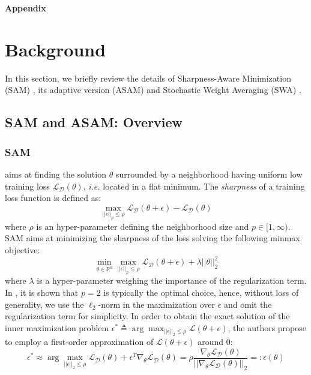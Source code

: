 {\noindent
\textbf{\Large{Appendix}}}

\section{Background}
\label{app:background}
In this section, we briefly review the details of Sharpness-Aware Minimization (SAM) \cite{foret2020sharpness}, its adaptive version (ASAM) \cite{kwon2021asam} and Stochastic Weight Averaging (SWA) \cite{izmailov2018averaging}.
\subsection{SAM and ASAM: Overview}
\subsubsection{SAM} aims at finding the solution $\theta$ surrounded by a neighborhood having uniform low training loss $\mathcal{L}_\mathcal{D}(\theta)$, \textit{i.e.} located in a flat minimum. The \textit{sharpness} of a training loss function is defined as:
\begin{equation}
    \max_{||\epsilon||_p \leq \rho}  \mathcal{L}_\mathcal{D}(\theta+\epsilon) - \mathcal{L}_\mathcal{D}(\theta)
    \label{math:sharpness}
\end{equation}
where $\rho$ is an hyper-parameter defining the neighborhood size and $p\in[1,\infty)$. SAM aims at minimizing the sharpness of the loss solving the following minmax objective:
\begin{equation}
    \min_{\theta\in\mathbb{R}^d}\max_{||\epsilon||_p \leq \rho}  \mathcal{L}_\mathcal{D}(\theta+\epsilon) + \lambda ||\theta||_2^2
    \label{math:minmax_sam}
\end{equation}
where $\lambda$ is a hyper-parameter weighing the importance of the regularization term. In \cite{foret2020sharpness}, it is shown that $p=2$ is typically the optimal choice, hence, without loss of generality, we use the ${\ell}_2$-norm in the maximization over $\epsilon$ and omit the regularization term for simplicity. In order to obtain the exact solution of the inner maximization problem $\epsilon^* \triangleq \arg\max_{||\epsilon||_2 \leq \rho} \mathcal{L}(\theta+\epsilon)$, the authors propose to employ a first-order approximation of $\mathcal{L}(\theta+\epsilon)$ around $0$:
\begin{equation}
    \epsilon^* \approx \arg\max_{||\epsilon||_2 \leq \rho} \mathcal{L}_\mathcal{D}(\theta) + \epsilon^T \nabla_{\theta}\mathcal{L}_\mathcal{D}(\theta) =\rho\frac{\nabla_{\theta}\mathcal{L}_\mathcal{D}(\theta)}{||\nabla_{\theta}\mathcal{L}_\mathcal{D}(\theta)||_2} =: \hat{\epsilon}(\theta)
    \label{math:approx_sam}
\end{equation}
